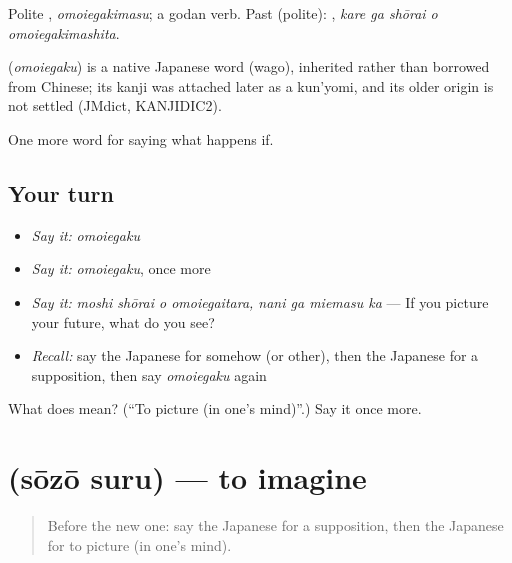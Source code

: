 Polite \textbf{}, \emph{omoiegakimasu}; a godan verb. Past (polite): \textbf{  }, \emph{kare ga shōrai o omoiegakimashita}.

\begin{cousinweb}
\textbf{} (\emph{omoiegaku}) is a native Japanese word (wago), inherited rather than borrowed from Chinese; its kanji was attached later as a kun'yomi, and its older origin is not settled (JMdict, KANJIDIC2).
\end{cousinweb}

\begin{grammarlens}[title={What you've built}]
One more word for saying what happens if.
\end{grammarlens}

\subsection*{Your turn}
\begin{itemize}
\raggedright
  \item \emph{Say it:} \emph{omoiegaku}
  \item \emph{Say it:} \emph{omoiegaku}, once more
  \item \emph{Say it:} \emph{moshi shōrai o omoiegaitara, nani ga miemasu ka} — If you picture your future, what do you see?
  \item \emph{Recall:} say the Japanese for somehow (or other), then the Japanese for a supposition, then say \emph{omoiegaku} again
\end{itemize}

\begin{tcolorbox}[breakable,colback=teal!4,colframe=teal!35!black,title={Before you move on}]
What does  mean? (\textquotedblleft{}To picture (in one's mind)\textquotedblright{}.) Say it once more.
\end{tcolorbox}
\section[\texorpdfstring{\ja{そうぞうする} (sōzō suru)}{そうぞうする (sōzō suru)}]{ (sōzō suru) — to imagine}

\label{lesson:JA-C524-souzou-suru}



\begin{quote}
Before the new one: say the Japanese for a supposition, then the Japanese for to picture (in one's mind).
\end{quote}

